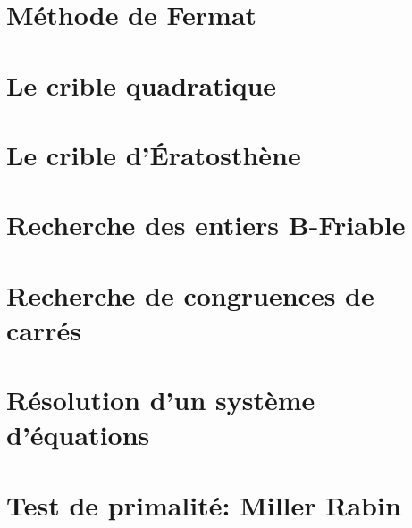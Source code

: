 \documentclass[a4paper]{report}
\theoremstyle{plain}
\theoremstyle{definition}
\begin{document}
    \chapter{Méthode de Fermat}
    

    \chapter{Le crible quadratique}
    



    \appendix

    \chapter{Le crible d'Ératosthène}
    \label{Eratosthène}
    

    \chapter{Recherche des entiers B-Friable}
    \label{B-friabilite}
    

    \chapter{Recherche de congruences de carrés}
    \label{Matrices}
    

    \chapter{Résolution d'un système d'équations}
    \label{Noyau}
    

    \chapter{Test de primalité: Miller Rabin}
    \label{Miller_Rabin}
    
\end{document}

